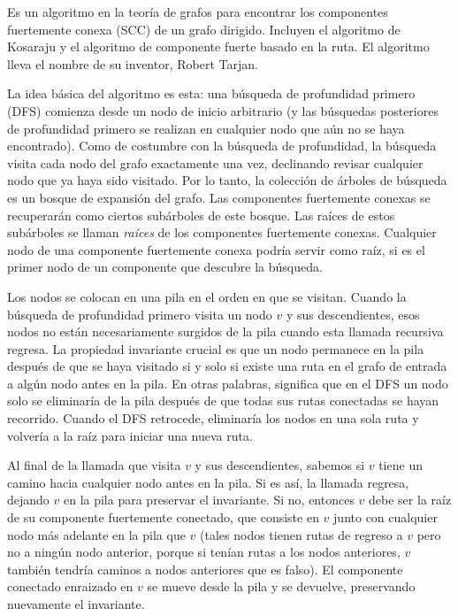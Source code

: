 Es un algoritmo en la teoría de grafos para encontrar los componentes fuertemente conexa (SCC) de un grafo dirigido. Incluyen el algoritmo de Kosaraju y el algoritmo de componente fuerte basado en la ruta. El algoritmo lleva el nombre de su inventor, Robert Tarjan.

La idea básica del algoritmo es esta: una búsqueda de profundidad primero (DFS) comienza desde un nodo de inicio arbitrario (y las búsquedas posteriores de profundidad primero se realizan en cualquier nodo que aún no se haya encontrado). Como de costumbre con la búsqueda de profundidad, la búsqueda visita cada nodo del grafo exactamente una vez, declinando revisar cualquier nodo que ya haya sido visitado. Por lo tanto, la colección de árboles de búsqueda es un bosque de expansión del grafo. Las componentes fuertemente conexas se recuperarán como ciertos subárboles de este bosque. Las raíces de estos subárboles se llaman \emph{raíces} de los componentes fuertemente conexas. Cualquier nodo de una componente fuertemente conexa podría servir como raíz, si es el primer nodo de un componente que descubre la búsqueda.

Los nodos se colocan en una pila en el orden en que se visitan. Cuando la búsqueda de profundidad primero visita un nodo $v$ y sus descendientes, esos nodos no están necesariamente surgidos de la pila cuando esta llamada recursiva regresa. La propiedad invariante crucial es que un nodo permanece en la pila después de que se haya visitado si y solo si existe una ruta en el grafo de entrada a algún nodo antes en la pila. En otras palabras, significa que en el DFS un nodo solo se eliminaría de la pila después de que todas sus rutas conectadas se hayan recorrido. Cuando el DFS retrocede, eliminaría los nodos en una sola ruta y volvería a la raíz para iniciar una nueva ruta.

Al final de la llamada que visita $v$ y sus descendientes, sabemos si $v$ tiene un camino hacia cualquier nodo antes en la pila. Si es así, la llamada regresa, dejando $v$ en la pila para preservar el invariante. Si no, entonces $v$ debe ser la raíz de su componente fuertemente conectado, que consiste en $v$ junto con cualquier nodo más adelante en la pila que $v$ (tales nodos tienen rutas de regreso a $v$ pero no a ningún nodo anterior, porque si tenían rutas a los nodos anteriores, $v$ también tendría caminos a nodos anteriores que es falso). El componente conectado enraizado en $v$ se mueve desde la pila y se devuelve, preservando nuevamente el invariante.

